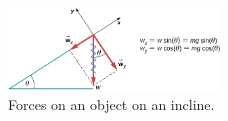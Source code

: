 \documentclass{article}
\begin{document}
\begin{figure}
\centering
\includegraphics[width=0.5\textwidth]{figures/incline.jpeg}
\caption{\label{fig:1} Forces on an object on an incline.}
\end{figure}
\end{document}
